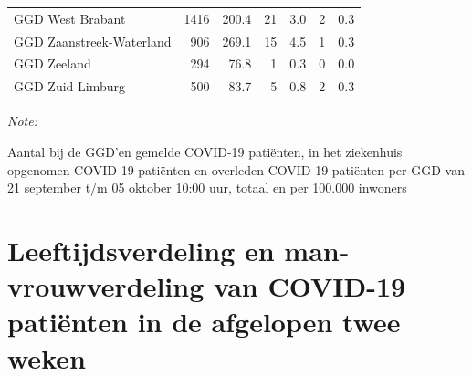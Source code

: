 \documentclass[
  english,
  man,floatsintext]{apa6}
\begin{document}
\begin{table}[H]
\begin{threeparttable}
\begin{tabular}{lrrrrrr}
GGD West Brabant & 1416 & 200.4 & 21 & 3.0 & 2 & 0.3\\
GGD Zaanstreek-Waterland & 906 & 269.1 & 15 & 4.5 & 1 & 0.3\\
GGD Zeeland & 294 & 76.8 & 1 & 0.3 & 0 & 0.0\\
GGD Zuid Limburg & 500 & 83.7 & 5 & 0.8 & 2 & 0.3\\
\bottomrule
\end{tabular}
\begin{tablenotes}
\item \textit{Note: } 
\item Aantal bij de GGD’en gemelde COVID-19 patiënten, in het ziekenhuis opgenomen COVID-19 patiënten en overleden COVID-19 patiënten per GGD van 21 september t/m 05 oktober 10:00 uur, totaal en per 100.000 inwoners
\end{tablenotes}
\end{threeparttable}
\endgroup{}
\end{table}

\newpage

\hypertarget{leeftijdsverdeling-en-man-vrouwverdeling-van-covid-19-patiuxebnten-in-de-afgelopen-twee-weken}{%
\section{Leeftijdsverdeling en man-vrouwverdeling van COVID-19 patiënten in de afgelopen twee weken}\label{leeftijdsverdeling-en-man-vrouwverdeling-van-covid-19-patiuxebnten-in-de-afgelopen-twee-weken}}
\end{document}
